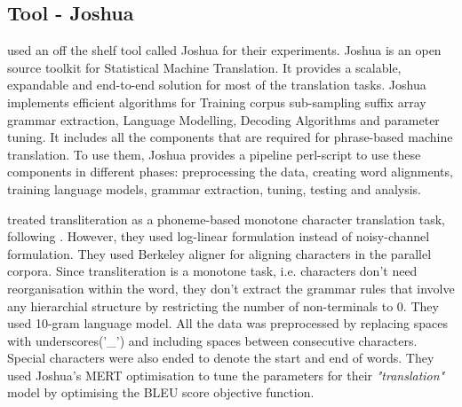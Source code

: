 \documentclass[11pt,a4paper]{article}
\begin{document}
\subsection{Tool - Joshua}
\citet{burch-1} used an off the shelf tool called Joshua \citet{li-joshua-1} for their experiments. Joshua is an open source toolkit for Statistical Machine Translation. It provides a scalable, expandable and end-to-end solution for most of the translation tasks. Joshua implements efficient algorithms for Training corpus sub-sampling suffix array grammar extraction, Language Modelling, Decoding Algorithms and parameter tuning. It includes all the components that are required for phrase-based machine translation. To use them, Joshua provides a pipeline perl-script to use these components in different phases: preprocessing the data, creating word alignments, training language models, grammar extraction, tuning, testing and analysis. 
\par
\citet{burch-1} treated transliteration as a phoneme-based monotone character translation task, following \citet*{virga-khudanpur-1}. However, they used log-linear formulation instead of noisy-channel formulation. They used Berkeley aligner for aligning characters in the parallel corpora. Since transliteration is a monotone task, i.e. characters don't need reorganisation within the word, they don't extract the grammar rules that involve any hierarchial structure by restricting the number of non-terminals to 0. They used 10-gram language model. All the data was preprocessed by replacing spaces with underscores('\_') and including spaces between consecutive characters. Special characters were also ended to denote the start and end of words. They used Joshua's MERT optimisation to tune the parameters for their \textit{"translation"} model by optimising the BLEU score objective function. 
\end{document}
